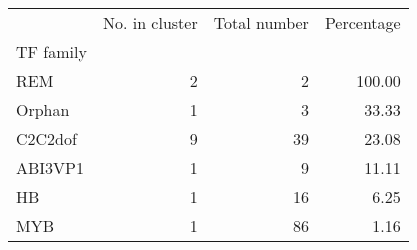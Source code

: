 \begin{tabular}{lrrr}
\toprule
{} &  No. in cluster &  Total number &  Percentage \\
TF family &                 &               &             \\
\midrule
REM       &               2 &             2 &      100.00 \\
Orphan    &               1 &             3 &       33.33 \\
C2C2dof   &               9 &            39 &       23.08 \\
ABI3VP1   &               1 &             9 &       11.11 \\
HB        &               1 &            16 &        6.25 \\
MYB       &               1 &            86 &        1.16 \\
\bottomrule
\end{tabular}
